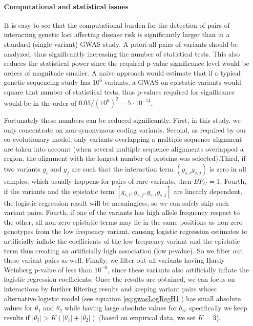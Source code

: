 \paragraph{Computational and statistical issues} It is easy to see that the computational burden for the detection of pairs of interacting genetic loci affecting disease risk is significantly larger than in a standard (single variant) GWAS study. A priori all pairs of variants should be analyzed, thus significantly increasing the number of statistical tests. This also reduces the statistical power since the required p-value significance level would be orders of magnitude smaller. A na\:ive approach would estimate that if a typical genetic sequencing study has $10^6$ variants, a GWAS on epistatic variants would square that number of statistical tests, thus p-values required for significance would be in the order of $0.05 / (10^6)^2 = 5 \cdot 10^{-14}$. 

Fortunately these numbers can be reduced significantly. First, in this study, we only concentrate on non-synonymous coding variants. Second, as required by our co-evolutionary model, only variants overlapping a multiple sequence alignment are taken into account (when several multiple sequence alignments overlapped a region, the alignment with the longest number of proteins was selected).Third, if two variants $g_i$ and $g_j$ are such that the interaction term $(g_{s,i} g_{s,j})$ is zero in all samples, which usually happens for pairs of rare variants, then $BF_G = 1$. Fourth, if the variants and the epistatic term $[g_{s,i}, g_{s,j}, g_{s,i} g_{s,j}]$ are linearly dependent, the logistic regression result will be meaningless, so we can safely skip such variant pairs. Fourth, if one of the variants has high allele frequency respect to the other, all non-zero epistatic terms may lie in the same positions as non-zero genotypes from the low frequency variant, causing logistic regression estimates to artificially inflate the coefficients of the low frequency variant and the epistatic term thus creating an artificially high association (low p-value). So we filter out these variant pairs as well. Finally, we filter out all variants having Hardy-Weinberg p-value of less than $10^{-6}$, since these variants also artificially inflate the logistic regression coefficients.  Once the results are obtained, we can focus on interactions by further filtering results and keeping variant pairs whose alternative logistic model (see equation \ref{eq:gwasLogRegH1}) has small absolute values for $\theta_1$ and $\theta_2$ while having large absolute values for $\theta_3$, specifically we keep results if $|\theta_3| > K ( |\theta_1| + |\theta_2| )$ (based on empirical data, we set $K=3$). 

